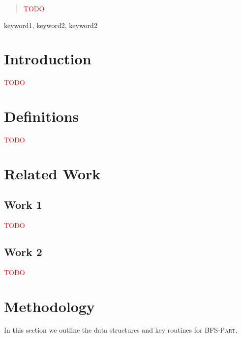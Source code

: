 \documentclass[conference]{IEEEtran}
\newcommand{\bfspart}{\textsc{BFS-Part}\xspace}
\begin{document}
\begin{abstract}
    \textcolor{red}{TODO}
\end{abstract}

\begin{IEEEkeywords}
keyword1, keyword2, keyword2
\end{IEEEkeywords}

\section{Introduction}
\textcolor{red}{TODO}

\section{Definitions}
\textcolor{red}{TODO}

\section{Related Work}

\subsection{Work 1}

\textcolor{red}{TODO}
\cite{parmetis}

\subsection{Work 2}

\textcolor{red}{TODO}

\section{Methodology}
In this section we outline the data structures and key routines for \bfspart.
\end{document}
